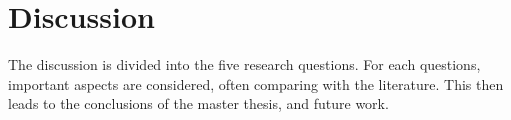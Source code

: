 \chapter{Discussion}\label{cha:discussion}



The discussion is divided into the five research questions. For each questions, important aspects are considered, often comparing with the literature. This then leads to the conclusions of the master thesis, and future work.











